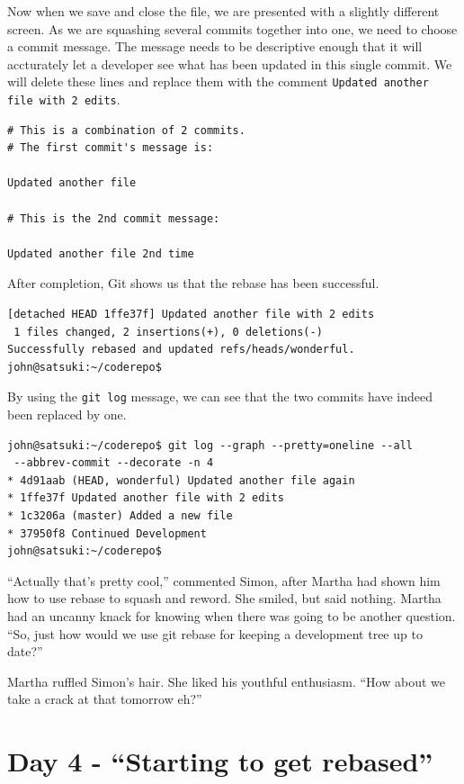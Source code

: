 Now when we save and close the file, we are presented with a slightly different screen.  As we are squashing several commits together into one, we need to choose a commit message.  The message needs to be descriptive enough that it will accturately let a developer see what has been updated in this single commit.  We will delete these lines and replace them with the comment \texttt{Updated another file with 2 edits}.

\begin{Verbatim}
# This is a combination of 2 commits.
# The first commit's message is:

Updated another file

# This is the 2nd commit message:

Updated another file 2nd time
\end{Verbatim}

After completion, Git shows us that the rebase has been successful.

\begin{Verbatim}
[detached HEAD 1ffe37f] Updated another file with 2 edits
 1 files changed, 2 insertions(+), 0 deletions(-)
Successfully rebased and updated refs/heads/wonderful.
john@satsuki:~/coderepo$ 
\end{Verbatim}

By using the \texttt{git log} message, we can see that the two commits have indeed been replaced by one.

\begin{Verbatim}
john@satsuki:~/coderepo$ git log --graph --pretty=oneline --all 
 --abbrev-commit --decorate -n 4
* 4d91aab (HEAD, wonderful) Updated another file again
* 1ffe37f Updated another file with 2 edits
* 1c3206a (master) Added a new file
* 37950f8 Continued Development
john@satsuki:~/coderepo$ 
\end{Verbatim}

\begin{trenches}
``Actually that's pretty cool,'' commented Simon, after Martha had shown him how to use rebase to squash and reword.  She smiled, but said nothing.  Martha had an uncanny knack for knowing when there was going to be another question.  ``So, just how would we use git rebase for keeping a development tree up to date?''

Martha ruffled Simon's hair.  She liked his youthful enthusiasm.  ``How about we take a crack at that tomorrow eh?''
\end{trenches}

\section{Day 4 - ``Starting to get rebased''}
